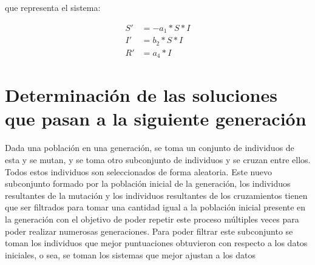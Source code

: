 \begin{center}
\begin{adjustbox}{width=0.5\textwidth, keepaspectratio}
    \end{adjustbox}
\end{center}

que representa el sistema:

\begin{align*}
    S' & = - a_1 * S * I \\
    I' & = b_2 * S * I   \\
    R' & = a_4 * I
\end{align*}

\section{Determinación de las soluciones que pasan a la siguiente generación}

Dada una población en una generación, se toma un conjunto de individuos de esta y se mutan, y se toma otro subconjunto de individuos y se cruzan entre ellos. Todos estos individuos son seleccionados de forma aleatoria. Este nuevo subconjunto formado por la población inicial de la generación, los individuos resultantes de la mutación y los individuos resultantes de los cruzamientos tienen que ser filtrados para tomar una cantidad igual a la población inicial presente en la generación con el objetivo de poder repetir este proceso múltiples veces para poder realizar numerosas generaciones. Para poder filtrar este subconjunto se toman los individuos que mejor puntuaciones obtuvieron con respecto a los datos iniciales, o sea, se toman los sistemas que mejor ajustan a los datos